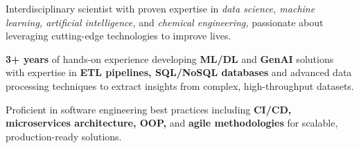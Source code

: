 

\begin{cvparagraph}
    \vspace{0.5cm}
    \begin{cvitemsfree}
        \item{Interdisciplinary scientist with proven expertise in \textit{data science, machine learning, artificial intelligence,} and \textit{chemical engineering,} passionate about leveraging cutting-edge technologies to improve lives.}

        \item{\textbf{3+ years} of hands-on experience developing \textbf{ML/DL} and \textbf{GenAI} solutions with expertise in \textbf{ETL pipelines, SQL/NoSQL databases} and advanced data processing techniques to extract insights from complex, high-throughput datasets.}
        
        \item{Proficient in software engineering best practices including \textbf{CI/CD, microservices architecture, OOP,} and \textbf{agile methodologies} for scalable, production-ready solutions.}


                
    \end{cvitemsfree}


\end{cvparagraph}
